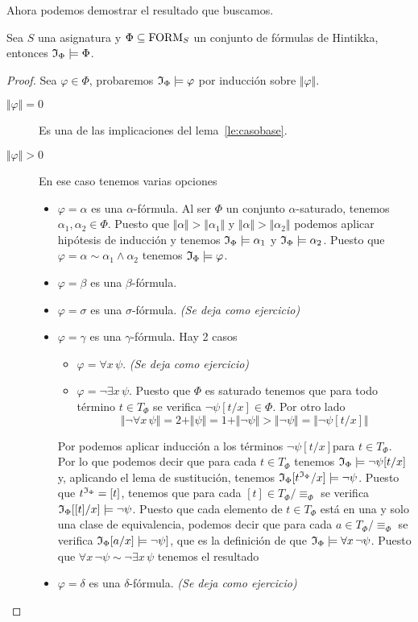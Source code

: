 Ahora podemos demostrar el resultado que buscamos.
\begin{theorem}
  Sea $S$ una asignatura y $\Phi\subseteq\mbox{FORM}_{S}$ un conjunto de fórmulas de Hintikka, entonces $\mathfrak{I}_{\Phi}\models\Phi$.
  \begin{proof}
    Sea $\varphi\in\Phi$, probaremos $\mathfrak{I}_{\Phi}\models\varphi$ por inducción sobre $\Vert\varphi\Vert$.
    \begin{description}
    \item[$\Vert\varphi\Vert=0$] Es una de las implicaciones del lema~\ref{le:casobase}.
    \item[$\Vert\varphi\Vert>0$] En ese caso tenemos varias opciones
      \begin{itemize}
      \item $\varphi=\alpha$ es una $\alpha$-fórmula. Al ser $\Phi$ un conjunto $\alpha$-saturado, tenemos $\alpha_{1},\alpha_{2}\in\Phi$. Puesto que $\Vert\alpha\Vert >\Vert\alpha_{1}\Vert$ y $\Vert\alpha\Vert>\Vert\alpha_{2}\Vert$ podemos aplicar hipótesis de inducción y tenemos $\mathfrak{I}_{\Phi}\models\alpha_{1}$ y $\mathfrak{I}_{\Phi}\models\alpha_{2}$. Puesto que $\varphi=\alpha\sim\alpha_{1}\wedge\alpha_{2}$ tenemos $\mathfrak{I}_{\Phi}\models\varphi$.
	\item $\varphi=\beta$ es una $\beta$-fórmula. 
      \item $\varphi=\sigma$ es una $\sigma$-fórmula. \textit{(Se deja como ejercicio)}
      \item $\varphi=\gamma$ es una $\gamma$-fórmula.
        Hay 2 casos
        \begin{itemize}
        \item $\varphi=\forall x\,\psi$. \textit{(Se deja como ejercicio)}
        \item $\varphi=\neg\exists x\,\psi$.
          Puesto que $\Phi$ es saturado tenemos que para todo
          término $t\in T_{\Phi}$ se verifica $\neg\psi[t/x]\in\Phi$. Por otro lado
          \[ \Vert\neg\forall x\,\psi\Vert = 2+\Vert\psi\Vert =
            1+\Vert\neg\psi\Vert > \Vert\neg\psi\Vert = \Vert\neg\psi[t/x]\Vert \]
        \end{itemize}
        Por podemos aplicar inducción a los términos $\neg\psi[t/x]$para $t\in T_{\Phi}$. Por lo que podemos decir que para cada $t\in T_{\Phi}$ tenemos $\mathfrak{I}_{\Phi}\models \neg\psi[t/x]$ y, aplicando el lema de sustitución, tenemos $\mathfrak{I}_{\Phi}[t^{\mathfrak{I}_{\Phi}}/x]\models \neg\psi$. Puesto que $t^{\mathfrak{I}_{\Phi}}=[t]$, tenemos que para cada $[t]\in T_{\Phi}/\equiv_{\Phi}$ se verifica$\mathfrak{I}_{\Phi}[[t]/x]\models \neg\psi$. Puesto que cada elemento de $t\in T_{\Phi}$ está en una y solo una clase de equivalencia, podemos decir que para cada $a\in T_{\Phi}/\equiv_{\Phi}$ se verifica $\mathfrak{I}_{\Phi}[a/x]\models \neg\psi]$, que es la definición de que $\mathfrak{I}_{\Phi}\models\forall x\,\neg\psi$. Puesto que $\forall x\,\neg\psi\sim\neg\exists x\,\psi$ tenemos el resultado
      \item $\varphi=\delta$ es una $\delta$-fórmula. \textit{(Se deja como ejercicio)}
      \end{itemize}
    \end{description}
  \end{proof}
\end{theorem}